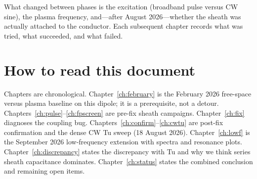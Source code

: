 What changed between phases is the excitation (broadband pulse versus CW sine), the plasma frequency, and---after August 2026---whether the sheath was actually attached to the conductor. Each subsequent chapter records what was tried, what succeeded, and what failed.

\section{How to read this document}

Chapters are chronological. Chapter~\ref{ch:february} is the February 2026 free-space versus plasma baseline on this dipole; it is a prerequisite, not a detour. Chapters~\ref{ch:pulse}--\ref{ch:fpscreen} are pre-fix sheath campaigns. Chapter~\ref{ch:fix} diagnoses the coupling bug. Chapters~\ref{ch:confirm}--\ref{ch:cwtu} are post-fix confirmation and the dense CW Tu sweep (18 August 2026). Chapter~\ref{ch:lowf} is the September 2026 low-frequency extension with spectra and resonance plots. Chapter~\ref{ch:discrepancy} states the discrepancy with Tu and why we think series sheath capacitance dominates. Chapter~\ref{ch:status} states the combined conclusion and remaining open items.
